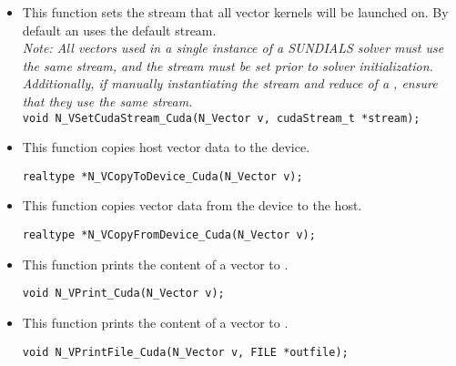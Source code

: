 \begin{itemize}

\item {}

 This function sets the {\cuda} stream that all vector kernels will be launched on.
 By default an {\nveccuda} uses the default {\cuda} stream.\\
 
 \textit{Note: All vectors used in a single instance of a SUNDIALS solver must
  use the same {\cuda} stream, and the {\cuda} stream must be set prior to
  solver initialization. Additionally, if manually instantiating the stream and
  reduce  of a , ensure that they
  use the same {\cuda} stream.}\\

 \verb|void N_VSetCudaStream_Cuda(N_Vector v, cudaStream_t *stream);|


\item {}

 This function copies host vector data to the device.

 \verb|realtype *N_VCopyToDevice_Cuda(N_Vector v);|



\item {}

 This function copies vector data from the device to the host.

 \verb|realtype *N_VCopyFromDevice_Cuda(N_Vector v);|



\item {}

  This function prints the content of a {\cuda} vector to .

  \verb|void N_VPrint_Cuda(N_Vector v);|


\item {}

  This function prints the content of a {\cuda} vector to .

  \verb|void N_VPrintFile_Cuda(N_Vector v, FILE *outfile);|


\end{itemize}
